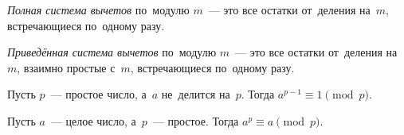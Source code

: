 


\begingroup
    \ifdefined\mathup%
        \providecommand\eulerphi{\mathup{\mupphi}}%
    \fi%
    \ifdefined\upphi%
        \providecommand\eulerphi{\upphi}%
    \fi
    \providecommand\eulerphi{\phi}%
    \def\binom#1#2{\mathrm{C}_{#1}^{#2}}%

\emph{Полная система вычетов} по~модулю $m$~--- это все остатки от~деления
на~$m$, встречающиеся по~одному разу.

\emph{Приведённая система вычетов} по~модулю $m$~--- это все остатки от~деления
на~$m$, взаимно простые с~$m$, встречающиеся по~одному разу.

Пусть $p$~--- простое число, а~$a$ не~делится на~$p$.
Тогда $a^{p-1} \equiv 1 \pmod{p}$.

Пусть $a$~--- целое число, а~$p$~--- простое.
Тогда $a^{p} \equiv a \pmod{p}$.

